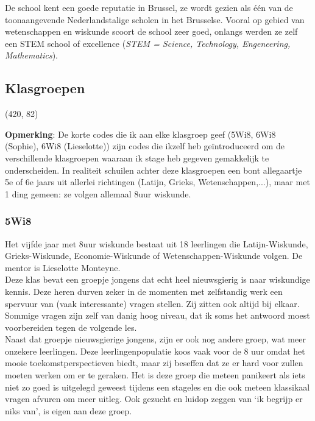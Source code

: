 \documentclass[a4paper,11pt]{article}
\theoremstyle{definition}
\begin{document}
\noindent De school kent een goede reputatie in Brussel, ze wordt gezien als één 
van de toonaangevende Nederlandstalige scholen in het Brusselse. Vooral op 
gebied van wetenschappen en wiskunde scoort de school zeer goed, onlangs werden ze zelf een STEM school of excellence (\emph{STEM = Science, Technology, Engeneering, Mathematics}).


\subsection{Klasgroepen}

\noindent\framebox(420, 82){ 
\parbox{400\unitlength}{\textbf{Opmerking}: De korte codes die ik aan elke klasgroep geef (5Wi8, 6Wi8 (Sophie), 6Wi8 (Lieselotte)) 
  zijn codes die ikzelf heb geïntroduceerd om de verschillende klasgroepen 
  waaraan ik stage heb gegeven gemakkelijk te onderscheiden. In realiteit schuilen 
  achter deze klasgroepen een bont allegaartje 5e of 6e jaars uit allerlei 
  richtingen (Latijn, Grieks, Wetenschappen,...), maar met 1 ding gemeen: ze 
  volgen allemaal 8uur wiskunde.}
}
\subsubsection{5Wi8}\label{5Wi8}
Het vijfde jaar met 8uur wiskunde bestaat uit 18 leerlingen die Latijn-Wiskunde, 
Grieks-Wiskunde, Economie-Wiskunde of Wetenschappen-Wiskunde volgen. De mentor is 
Lieselotte Monteyne.\\

\noindent Deze klas bevat een groepje jongens dat echt heel nieuwsgierig is naar wiskundige kennis. Deze heren durven zeker in de momenten met
 zelfstandig werk een spervuur van (vaak interessante) 
vragen stellen. Zij zitten ook altijd bij elkaar. Sommige vragen zijn zelf van danig hoog niveau, dat ik 
soms het antwoord moest voorbereiden tegen de volgende les.\\

\noindent Naast dat groepje 
nieuwsgierige jongens, zijn er ook nog andere groep, wat meer onzekere leerlingen. 
Deze leerlingenpopulatie koos vaak voor de 8 uur omdat het mooie 
toekomstperspectieven biedt, maar zij beseffen dat ze er hard voor zullen moeten 
werken om er te geraken. Het is deze groep die meteen panikeert als iets niet zo goed is 
uitgelegd geweest tijdens een stageles en die ook meteen klassikaal vragen 
afvuren om meer uitleg. Ook gezucht en luidop zeggen van `ik begrijp er niks 
van', is eigen aan deze groep. \\
\end{document}
